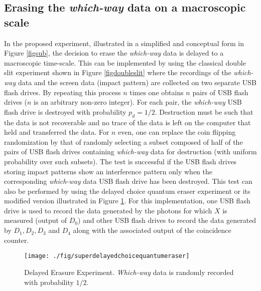 \documentclass[11pt]{article}
\theoremstyle{definition}
\begin{document}
\subsection{Erasing the \emph{which-way} data on a macroscopic scale}\label{secpredict3}
In the proposed experiment, illustrated in a simplified and conceptual form in Figure \ref{figsub}, the decision to erase the \emph{which-way} data is delayed to a macroscopic time-scale.
This can be implemented by using the classical double slit experiment shown in Figure \ref{figdoubleslit} where the recordings of the \emph{which-way} data and the screen data (impact pattern) are collected on two separate
USB flash drives.
By repeating this process $n$ times one obtains $n$ pairs of USB flash drives ($n$ is an arbitrary non-zero integer). For each pair, the  \emph{which-way} USB flash drive is destroyed with probability $p_d=1/2$. Destruction must be such that the data is not recoverable and no trace of the data is left on the computer that held and transferred the data. For $n$ even, one can replace the coin flipping randomization by that of randomly selecting a subset composed of half of the pairs of USB flash drives containing \emph{which-way} data for destruction (with uniform probability over such subsets). The test is successful if the USB flash drives storing impact patterns show an interference pattern only when the corresponding \emph{which-way} data USB flash drive has been destroyed.
This test can also be performed by using the delayed choice quantum eraser experiment or its modified version illustrated in Figure \ref{figsuperdelayedchoicequantumeraser}.  For this implementation, one USB flash drive is used to record the data generated by the photons for which $X$ is measured (output of $D_0$) and other USB flash drives to record the data generated by  $D_1, D_2, D_3$ and $D_4$ along with the associated output of the coincidence counter.



 \begin{figure}[h!]
	\begin{center}
			\texttt{[image: ./fig/superdelayedchoicequantumeraser]}
		\caption{Delayed Erasure Experiment. \emph{Which-way} data is randomly recorded with probability $1/2$.}\label{figsuperdelayedchoicequantumeraser}
	\end{center}
\end{figure}
\end{document}
